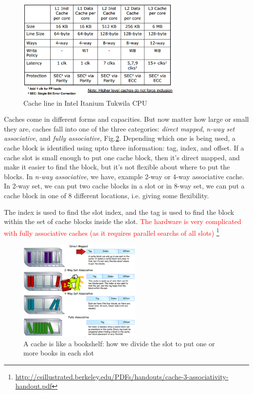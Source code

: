 \begin{figure}[hbt]
  \centerline{\includegraphics[height=5cm,
    angle=0]{./images/Intel_Itanium_Tukwila_cacheline.eps}}
  \caption{Cache line in Intel Itanium Tukwila CPU}
  \label{fig:Intel_Itanium_Tukwila_cacheline}
\end{figure}

\begin{mdframed}

Caches come in different forms and capacities. But now matter how large or small
they are, caches fall into one of the three categories: {\it direct mapped},
{\it n-way set associative}, and {\it fully associative},
Fig.\ref{fig:Cache_structures}. Depending which one is being used, a cache block
is identified using upto three information: tag, index, and offset. If a cache
slot is small enough to put one cache block, then it's direct mapped, and make
it easier to find the block, but it's not flexible about where to put the
blocks. In {\it n-way associative}, we have, example 2-way or 4-way associative
cache. In 2-way set, we can put two cache blocks in a slot or in 8-way set, we
can put a cache block in one of 8 different locations, i.e. giving some
flexibility.

The index is used to find the slot index, and the tag is used to find the block
within the set of cache blocks inside the slot. \textcolor{red}{The hardware is
very complicated with fully associative caches (as it requires parallel searchs
of all slots)}
\footnote{\url{http://csillustrated.berkeley.edu/PDFs/handouts/cache-3-associativity-handout.pdf}}
\end{mdframed}

\begin{figure}[hbt]
  \centerline{\includegraphics[height=5cm,
    angle=0]{./images/Cache_structures.eps}}
  \caption{A cache is like a bookshelf: how we divide the slot to put one or
  more books in each slot}
  \label{fig:Cache_structures}
\end{figure}


